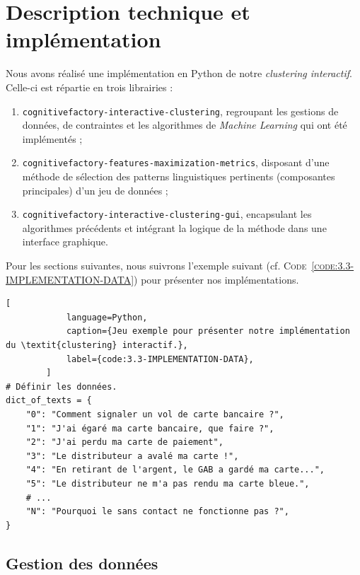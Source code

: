 		
	\section{Description technique et implémentation}
	\label{section:3.3-DESCRIPTION-IMPLEMENTATION}
		
		Nous avons réalisé une implémentation en Python de notre \textit{clustering interactif}. Celle-ci est répartie en trois librairies :
		\begin{enumerate}
			\item \texttt{cognitivefactory-interactive-clustering}, regroupant les gestions de données, de contraintes et les algorithmes de \textit{Machine Learning} qui ont été implémentés ;
			\item \texttt{cognitivefactory-features-maximization-metrics}, disposant d'une méthode de sélection des patterns linguistiques pertinents (composantes principales) d'un jeu de données ;
			\item \texttt{cognitivefactory-interactive-clustering-gui}, encapsulant les algorithmes précédents et intégrant la logique de la méthode dans une interface graphique.
		\end{enumerate}
		
		Pour les sections suivantes, nous suivrons l'exemple suivant (cf. \textsc{Code~\ref{code:3.3-IMPLEMENTATION-DATA}}) pour présenter nos implémentations.
		
		\begin{lstlisting}[
			language=Python,
			caption={Jeu exemple pour présenter notre implémentation du \textit{clustering} interactif.},
			label={code:3.3-IMPLEMENTATION-DATA},
		]
# Définir les données.
dict_of_texts = {
	"0": "Comment signaler un vol de carte bancaire ?",
	"1": "J'ai égaré ma carte bancaire, que faire ?",
	"2": "J'ai perdu ma carte de paiement",
	"3": "Le distributeur a avalé ma carte !",
	"4": "En retirant de l'argent, le GAB a gardé ma carte...",
	"5": "Le distributeur ne m'a pas rendu ma carte bleue.",
	# ...
	"N": "Pourquoi le sans contact ne fonctionne pas ?",
}
		\end{lstlisting}
		
		
		\subsection{Gestion des données}
		\label{section:3.3.1-GESTION-DES-DONNEES}
				
